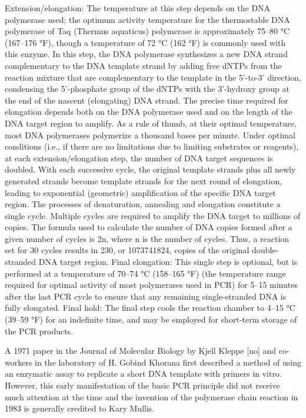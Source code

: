 Extension/elongation: The temperature at this step depends on the DNA polymerase used; the optimum activity temperature for the thermostable DNA polymerase of Taq (Thermus aquaticus) polymerase is approximately 75--80 °C (167--176 °F), though a temperature of 72 °C (162 °F) is commonly used with this enzyme. In this step, the DNA polymerase synthesizes a new DNA strand complementary to the DNA template strand by adding free dNTPs from the reaction mixture that are complementary to the template in the 5'-to-3' direction, condensing the 5'-phosphate group of the dNTPs with the 3'-hydroxy group at the end of the nascent (elongating) DNA strand. The precise time required for elongation depends both on the DNA polymerase used and on the length of the DNA target region to amplify. As a rule of thumb, at their optimal temperature, most DNA polymerases polymerize a thousand bases per minute. Under optimal conditions (i.e., if there are no limitations due to limiting substrates or reagents), at each extension/elongation step, the number of DNA target sequences is doubled. With each successive cycle, the original template strands plus all newly generated strands become template strands for the next round of elongation, leading to exponential (geometric) amplification of the specific DNA target region.
The processes of denaturation, annealing and elongation constitute a single cycle. Multiple cycles are required to amplify the DNA target to millions of copies. The formula used to calculate the number of DNA copies formed after a given number of cycles is 2n, where n is the number of cycles. Thus, a reaction set for 30 cycles results in 230, or 1073741824, copies of the original double-stranded DNA target region.
Final elongation: This single step is optional, but is performed at a temperature of 70--74 °C (158--165 °F) (the temperature range required for optimal activity of most polymerases used in PCR) for 5--15 minutes after the last PCR cycle to ensure that any remaining single-stranded DNA is fully elongated.
Final hold: The final step cools the reaction chamber to 4--15 °C (39--59 °F) for an indefinite time, and may be employed for short-term storage of the PCR products.

A 1971 paper in the Journal of Molecular Biology by Kjell Kleppe {[}no{]} and co-workers in the laboratory of H. Gobind Khorana first described a method of using an enzymatic assay to replicate a short DNA template with primers in vitro. However, this early manifestation of the basic PCR principle did not receive much attention at the time and the invention of the polymerase chain reaction in 1983 is generally credited to Kary Mullis.

